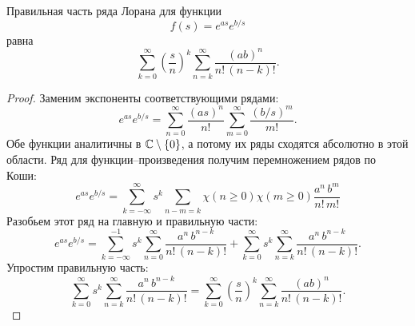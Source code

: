 \documentclass[../paper.tex]{subfiles}
\begin{document}
\begin{Lem}[Правильная часть ряда Лорана для $f(s) = e^{as}\,e^{b/s}$]
\label{laurent-1}
Правильная часть ряда Лорана для функции
\[
	f(s) = e^{as}e^{b/s}
\]
равна
\[
	\sum_{k=0}^{\infty} \left(\frac{s}{n}\right)^k \sum_{n=k}^{\infty} \frac{(ab)^n}{n!\,(n-k)!}
.\]
\end{Lem}
\begin{proof}
Заменим экспоненты соответствующими рядами:
\[
	e^{as} e^{b/s} 
	= \sum_{n=0}^{\infty} \frac{\left(as\right)^n}{n!}
		\sum_{m=0}^{\infty} \frac{\left(b/s\right)^m}{m!}
.\]
Обе функции аналитичны в $\mathbb{C} \setminus \{0\}$, а потому их ряды сходятся абсолютно в этой области.
Ряд для функции--произведения получим перемножением рядов по Коши:
\[
    e^{as} e^{b/s}
    = \sum_{k=-\infty}^{\infty} s^k \sum_{n-m=k} \chi(n \ge 0) \chi(m \ge 0) \frac{a^n\,b^m}{n!\,m!}
\]
Разобьем этот ряд на главную и правильную части:
\[
    e^{as} e^{b/s}
    = \sum_{k=-\infty}^{-1} s^k \sum_{n=0}^{\infty} \frac{a^n\,b^{n-k}}{n!\,(n-k)!}
    	+ \sum_{k=0}^{\infty} s^k \sum_{n=k}^{\infty} \frac{a^n\,b^{n-k}}{n!\,(n-k)!}
.\]
Упростим правильную часть:
\[
    \sum_{k=0}^{\infty} s^k \sum_{n=k}^{\infty} \frac{a^n\,b^{n-k}}{n!\,(n-k)!} =
    \sum_{k=0}^{\infty} \left(\frac{s}{n}\right)^k \sum_{n=k}^{\infty} \frac{(ab)^n}{n!\,(n-k)!}
.\]
\end{proof}
\end{document}
